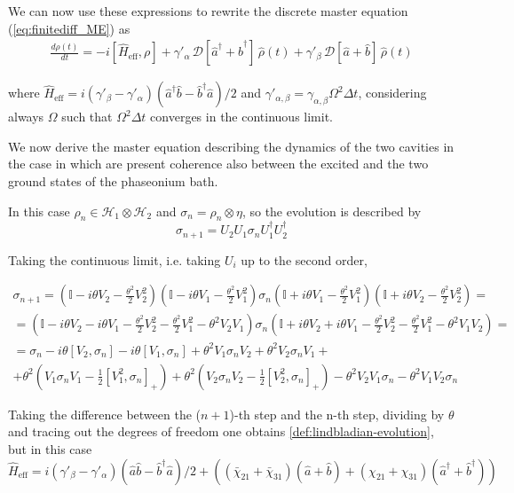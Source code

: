 \documentclass[entropy,article,submit,pdftex,moreauthors]{Definitions/mdpi}
\renewcommand{\a}{\hat{a}}
\newcommand{\ad}{\hat{a}^\dagger}
\renewcommand{\b}{\hat{b}}
\newcommand{\bd}{\hat{b}^\dagger}
\begin{document}
We can now use these expressions to rewrite the discrete master equation
(\ref{eq:finitediff_ME}) as
\begin{align}\label{def:lindbladian-evolution}
    \frac{d\rho(t)}{d t}
    = -i[\hat{H}_\text{eff},\rho] +  \gamma'_\alpha \,\mathcal{D}[\hat{a}^\dagger{+}\hat{b}^\dagger]\,\hat{\rho}(t)+\gamma'_\beta \,\mathcal{D}[\hat{a}{+}\hat{b}]\,\hat{\rho}(t)
\end{align}

where $\hat{H}_\text{eff}=i(\gamma'_\beta-\gamma'_\alpha)(\ad \b-\bd\a)/2$ and $\gamma'_{\alpha,\beta}=\gamma_{\alpha,\beta}\Omega^2\Delta t$, considering always $\Omega$ such that $\Omega^2 \Delta t$ converges in the continuous limit.

We now derive the master equation describing the dynamics of the two cavities in the case in which are present coherence also between the excited and the two ground states of the phaseonium bath. 

In this case $\rho_n \in \mathcal{H}_1\otimes\mathcal{H}_2$ and $\sigma_n=\rho_n\otimes\eta$, so the evolution is described by
\begin{equation}
\sigma_{n+1}=U_2 U_1\sigma_n U^\dagger_1 U^\dagger_2
\end{equation}

Taking the continuous limit, i.e. taking $U_i$ up to the second order,

\begin{multline}
\sigma_{n+1}=(\mathbb{I}-i\theta V_2-\frac{\theta^2}{2} V^2_2)(\mathbb{I}-i\theta V_1-\frac{\theta^2}{2} V^2_1)\sigma_n(\mathbb{I}+i\theta V_1-\frac{\theta^2}{2} V^2_1)(\mathbb{I}+i\theta V_2-\frac{\theta^2}{2} V^2_2)=\\
=(\mathbb{I}-i\theta V_2-i\theta V_1-\frac{\theta^2}{2} V^2_2-\frac{\theta^2}{2} V^2_1-\theta^2V_2V_1)\sigma_n(\mathbb{I}+i\theta V_2+i\theta V_1-\frac{\theta^2}{2} V^2_2-\frac{\theta^2}{2} V^2_1-\theta^2V_1V_2)=\\
=\sigma_n-i\theta[V_2,\sigma_n]-i\theta[V_1,\sigma_n]+\theta^2V_1\sigma_nV_2+\theta^2V_2\sigma_nV_1+\\+\theta^2(V_1\sigma_nV_1-\frac{1}{2}[V^2_1,\sigma_n]_+)+\theta^2(V_2\sigma_nV_2-\frac{1}{2}[V^2_2,\sigma_n]_+)-\theta^2V_2V_1\sigma_n-\theta^2V_1V_2\sigma_n
\end{multline}

Taking the difference between the ($n+1$)-th step and the n-th step, dividing by $\theta$ and tracing out the degrees of freedom one obtains \eqref{def:lindbladian-evolution}, but in this case $\hat{H}_\text{eff}=i(\gamma'_\beta-\gamma'_\alpha)(\a\b-\bd\a)/2+((\bar{\chi}_{21}+\bar{\chi}_{31})(\a+\b)+(\chi_{21}+\chi_{31})(\ad+\bd) )$
\end{document}
